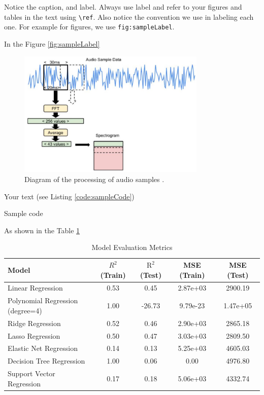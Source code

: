 Notice the caption, and label. Always use label and refer to your figures and tables in the text using \texttt{\textbackslash ref}. Also notice the convention we use in labeling each one. For example for figures, we use \texttt{fig:sampleLabel}.

In the Figure \ref{fig:sampleLabel} 

\begin{figure}[h!]
	\centering
	\includegraphics[width=0.8\textwidth]{Images/DataMining/audioProcessing.jpg}
	\caption{Diagram of the processing of audio samples \cite{Warden:2019}.} \label{fig:audioProcessing}
\end{figure}
Your text (see Listing \ref{code:sampleCode})

\begin{code}[h!]
	    
	
	\caption{Sample code}
	\label{code:sampleCode}
\end{code}

As shown in the Table \ref{table:modelEvaluation}

\begin{table}[h!]
	\footnotesize
	\centering
	\caption{Model Evaluation Metrics}\label{table:modelEvaluation}
	\begin{tabular}{lcccc}
		\hline
		Model                               & $R^2$ (Train) & $\text{R}^2$ (Test) & MSE (Train) & MSE (Test)    \\ \hline
		Linear Regression                   & 0.53      & 0.45         & 2.87e+03 & 2900.19  \\ 
		Polynomial Regression (degree=4)    & 1.00      & -26.73       & 9.79e-23 & 1.47e+05  \\ 
		Ridge Regression                    & 0.52      & 0.46         & 2.90e+03 & 2865.18  \\ 
		Lasso Regression                    & 0.50      & 0.47         & 3.03e+03 & 2809.50  \\ 
		Elastic Net Regression              & 0.14      & 0.13         & 5.25e+03 & 4605.03  \\ 
		Decision Tree Regression            & 1.00      & 0.06         & 0.00     & 4976.80  \\ 
		Support Vector Regression           & 0.17      & 0.18         & 5.06e+03 & 4332.74  \\ 
		\hline
	\end{tabular}
\end{table}


